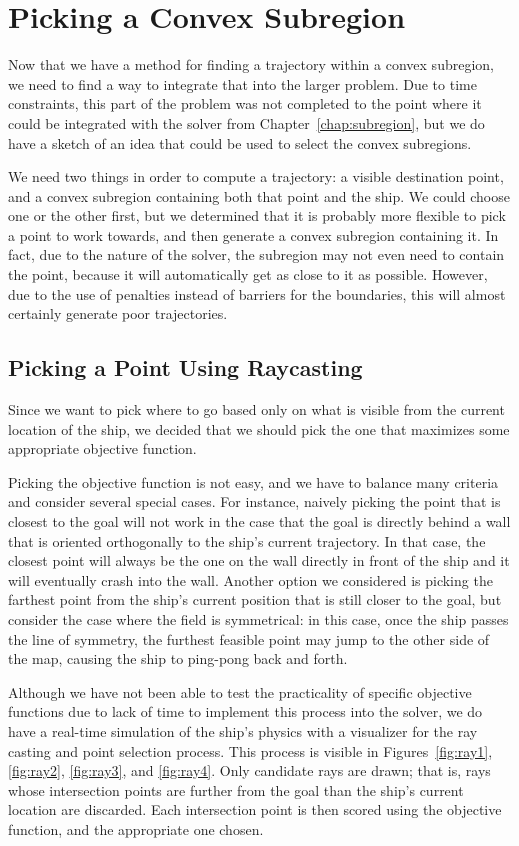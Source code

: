 \documentclass{report}
\begin{document}
\chapter{Picking a Convex Subregion}
Now that we have a method for finding a trajectory within a convex subregion, we
need to find a way to integrate that into the larger problem. Due to time constraints,
this part of the problem was not completed to the point where it could be integrated
with the solver from Chapter~\ref{chap:subregion}, but we do have a sketch of an
idea that could be used to select the convex subregions.

We need two things in order to compute a trajectory: a visible destination point, and
a convex subregion containing both that point and the ship. We could choose one or the
other first, but we determined that it is probably more flexible to pick a point to
work towards, and then generate a convex subregion containing it. In fact, due to the
nature of the solver, the subregion may not even need to contain the point, because it will
automatically get as close to it as possible. However, due to the use of penalties instead
of barriers for the boundaries, this will almost certainly generate poor trajectories.

\section{Picking a Point Using Raycasting} \label{sec:raycast}
Since we want to pick where to go based only on what is visible from the current
location of the ship, we decided that we should pick the one that maximizes some
appropriate objective function.

Picking the objective function is not easy, and we have to balance many criteria
and consider several special cases. For instance, naively picking the point that is closest to
the goal will not work in the case that the goal is directly behind a wall that is oriented
orthogonally to the ship's current trajectory. In that case, the closest point will
always be the one on the wall directly in front of the ship and it will eventually crash
into the wall. Another option we considered is picking the farthest point from the ship's current
position that is still closer to the goal, but consider the case where the field is symmetrical:
in this case, once the ship passes the line of symmetry, the furthest feasible point may jump to
the other side of the map, causing the ship to ping-pong back and forth.

Although we have not been able to test the practicality of specific objective
functions due to lack of time to implement this process into the solver, we do have
a real-time simulation of the ship's physics with a visualizer for the ray casting and
point selection process. This process is visible in Figures~\ref{fig:ray1}, \ref{fig:ray2},
\ref{fig:ray3}, and \ref{fig:ray4}. Only candidate rays are drawn; that is, rays whose
intersection points are further from the goal than the ship's current location are discarded.
Each intersection point is then scored using the objective function, and the appropriate
one chosen.
\end{document}
